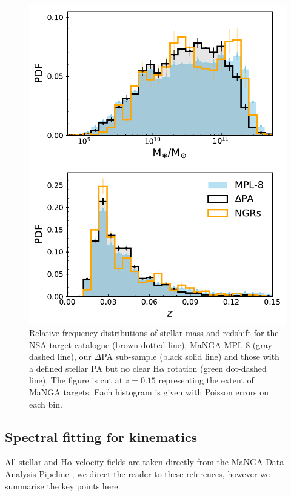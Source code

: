 \documentclass[fleqn,usenatbib]{mnras}
\begin{document}
\begin{figure}
	\includegraphics[width=\linewidth]{total_pop/mpl8_pa_stelmass_z.pdf}
    \caption{Relative frequency distributions of stellar mass and redshift for the NSA target catalogue (brown dotted line), MaNGA MPL-8 (gray dashed line), our $\Delta$PA sub-sample (black solid line) and those with a defined stellar PA but no clear H$\alpha$ rotation (green dot-dashed line). The figure is cut at $z=0.15$ representing the extent of MaNGA targets. Each histogram is given with Poisson errors on each bin.}
    \label{fig:samp_cons}
\end{figure}

\subsection{Spectral fitting for kinematics}
All stellar and H$\alpha$ velocity fields are taken directly from the MaNGA Data Analysis Pipeline \citep[DAP;][for an overview and emission line modelling respectively]{westfall2019, belfoire2019}, we direct the reader to these references, however we summarise the key points here.
\end{document}
